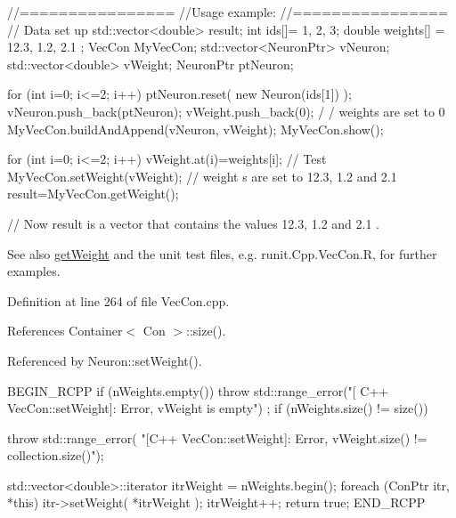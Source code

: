 \begin{DoxyCode}
        //================
        //Usage example:
        //================
        // Data set up
                std::vector<double> result;
                        int ids[]= {1, 2, 3};
                        double weights[] = {12.3, 1.2, 2.1 };
                        VecCon MyVecCon;
                        std::vector<NeuronPtr> vNeuron;
                        std::vector<double> vWeight;
                        NeuronPtr ptNeuron;

                        for (int i=0; i<=2; i++) {
                        ptNeuron.reset( new Neuron(ids[1]) );
                        vNeuron.push_back(ptNeuron);
                        vWeight.push_back(0);                                   /
      / weights are set to 0
                        }
                        MyVecCon.buildAndAppend(vNeuron, vWeight);
                        MyVecCon.show();

                        for (int i=0; i<=2; i++) {
                                vWeight.at(i)=weights[i];
                        }
        // Test
                        MyVecCon.setWeight(vWeight);                    // weight
      s are set to 12.3, 1.2 and 2.1
                        result=MyVecCon.getWeight();

        // Now result is a vector that contains the values 12.3, 1.2 and 2.1 .
\end{DoxyCode}


\begin{DoxySeeAlso}{See also}
\hyperlink{class_vec_con_aafa37c30d566b8784ac84d23a14b5638}{getWeight} and the unit test files, e.g. runit.Cpp.VecCon.R, for further examples. 
\end{DoxySeeAlso}


Definition at line 264 of file VecCon.cpp.



References Container$<$ Con $>$::size().



Referenced by Neuron::setWeight().


\begin{DoxyCode}
{
  BEGIN_RCPP
  if (nWeights.empty())
    { throw std::range_error("[ C++ VecCon::setWeight]: Error, vWeight is empty")
      ;}
  if (nWeights.size() != size())
    {
      throw std::range_error(
          "[C++ VecCon::setWeight]: Error, vWeight.size() != collection.size()");
      
    }
  std::vector<double>::iterator itrWeight = nWeights.begin();
  foreach (ConPtr itr, *this)
    {
      itr->setWeight( *itrWeight );
      itrWeight++;
    }
  return true;
END_RCPP}
\end{DoxyCode}


